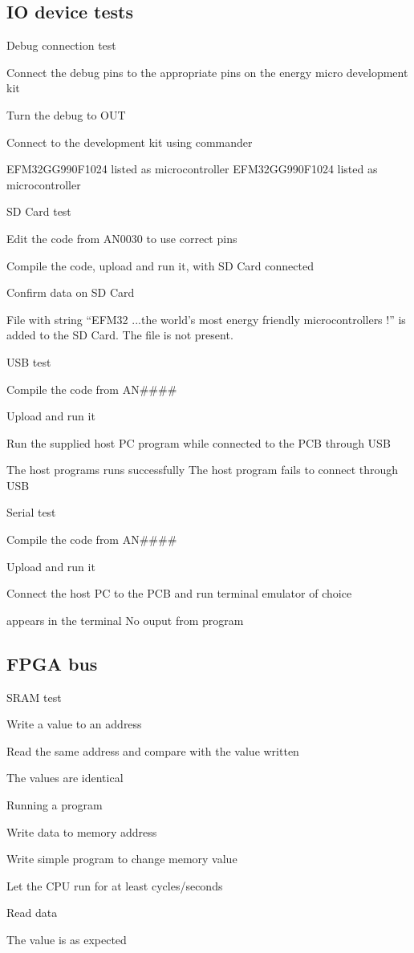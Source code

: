 \subsection{IO device tests}
\test
{Debug connection test}{
    \item{Connect the debug pins to the appropriate pins on the energy micro development kit}
    \item{Turn the debug to OUT}
    \item{Connect to the development kit using commander }
}{EFM32GG990F1024 listed as microcontroller}
{EFM32GG990F1024 listed as microcontroller}

\test
{SD Card test}{
    \item{Edit the code from AN0030 to use correct pins}
    \item{Compile the code, upload and run it, with SD Card connected}
    \item{Confirm data on SD Card}
}{File with string ``EFM32 ...the world's most energy friendly microcontrollers !'' is added to the SD Card.}
{The file is not present.}

\test
{USB test}{
    \item{Compile the code from AN\#\#\#\#}
    \item{Upload and run it}
    \item{Run the supplied host PC program while connected to the PCB through USB}
}{The host programs runs successfully}
{The host program fails to connect through USB}

\test
{Serial test}{
    \item{Compile the code from AN\#\#\#\#}
    \item{Upload and run it}
    \item{Connect the host PC to the PCB and run terminal emulator of choice}
}{ appears in the terminal}
{No ouput from program}


\subsection{FPGA bus}
\test
{SRAM test}{
    \item{Write a value to an address}
    \item{Read the same address and compare with the value written}
}{The values are identical}
{}

\test
{Running a program}{
    \item{Write data to memory address}
    \item{Write simple program to change memory value}
    \item{Let the CPU run for at least  cycles/seconds}
    \item{Read data}
}{The value is as expected}
{}
